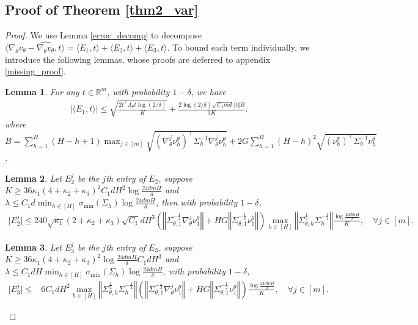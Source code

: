 \documentclass{article}
\newtheorem{lemma}{Lemma}[section]
\numberwithin{equation}{section}
\begin{document}
\subsection{Proof of Theorem \ref{thm2_var}}
\label{pfthm2_var}
\begin{proof}
We use Lemma \ref{error_decomp} to decompose $\langle\nabla_\theta v_\theta - \widehat{\nabla_\theta v_\theta}, t\rangle=\langle E_1, t\rangle+\langle E_2,t\rangle+\langle E_3,t\rangle$. To bound each term individually, we introduce the following lemmas, whose proofs are deferred to appendix \ref{missing_proof}. 
\begin{lemma}
\label{e1_finite_product}
For any $t\in\mathbb{R}^m$, with probability $1-\delta$, we have
\begin{align*}
    \vert\langle E_1, t\rangle\vert\leq\sqrt{\frac{2t^\top\Lambda_\theta t\log(2/\delta)}{K}}+\frac{2\log(2/\delta)\sqrt{C_1md}\Vert t\Vert B}{3K}. 
\end{align*}
where $B=\sum_{h=1}^H(H-h+1)\max_{j\in[m]}\sqrt{\left(\nabla^j_\theta\nu^\theta_h\right)^\top\Sigma_h^{-1}\nabla^j_\theta\nu^\theta_h}+2G\sum_{h=1}^H(H-h)^2\sqrt{\left(\nu^\theta_h\right)^\top\Sigma_h^{-1}\nu^\theta_h}$.
\end{lemma}
\begin{lemma}
\label{e2}
Let $E_2^j$ be the $j$th entry of $E_2$, suppose $K\geq 36\kappa_1(4+\kappa_2+\kappa_3)^2C_1dH^2\log\frac{24dmH}{\delta}$ and\\
$\lambda\leq C_1d\min_{h\in[H]}\sigma_{\min}(\Sigma_h)\log\frac{24dmH}{\delta}$, then with probability $1-\delta$, 
\begin{align*}
    \vert E_2^j\vert\leq 240\sqrt{\kappa_1}(2+\kappa_2+\kappa_3)\sqrt{C_1}dH^3\left(\left\Vert\Sigma_{\theta,1}^{-\frac{1}{2}}\nabla_\theta^j\nu^\theta_1\right\Vert+HG\left\Vert\Sigma_{\theta,1}^{-\frac{1}{2}}\nu^\theta_1\right\Vert\right)\max_{h\in[H]}\left\Vert\Sigma_{\theta,h}^{\frac{1}{2}}\Sigma_h^{-\frac{1}{2}}\right\Vert\frac{\log\frac{24dmH}{\delta}}{K},\quad\forall j\in[m].
\end{align*}
\end{lemma}
\begin{lemma}
\label{e3}
Let $E_3^j$ be the $j$th entry of $E_3$, suppose $K\geq 36\kappa_1(4+\kappa_2+\kappa_3)^2\log\frac{24dmH}{\delta}C_1dH^3$ and\\
$\lambda\leq C_1dH\min_{h\in[H]}\sigma_{\min}(\Sigma_h)\log\frac{24dmH}{\delta}$, with probability $1-\delta$, 
\begin{align*}
    \vert E_3^j\vert\leq&6C_1dH^2\max_{h\in[H]}\left\Vert\Sigma_{\theta,h}^{\frac{1}{2}}\Sigma_h^{-\frac{1}{2}}\right\Vert\left(\left\Vert\Sigma_{\theta,1}^{-\frac{1}{2}}\nabla_\theta^j\nu^{\theta}_1\right\Vert+HG\left\Vert\Sigma_{\theta,1}^{-\frac{1}{2}}\nu^\theta_1\right\Vert\right)\frac{\log\frac{24dmH}{\delta}}{K},\quad\forall j\in[m]. 

\end{align*}
\end{lemma}
\end{proof}
\end{document}
